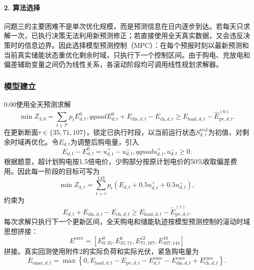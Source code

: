 \documentclass{cumcmthesis}
\newcommand{\Tset}{\mathcal{T}}
\begin{document}
\paragraph{2. 算法选择}

问题三的主要困难不是单次优化规模，而是预测信息在日内逐步到达。若每天只求解一次，已执行决策无法利用新预测修正；若直接使用全天真实数据，又会违反决策时的信息边界。因此选择模型预测控制（MPC）：在每个预报时刻以最新预测和当前真实储能状态重优化剩余时域，只执行下一个控制区间。由于购电、充放电和偏差辅助变量之间仍为线性关系，各滚动阶段均可调用线性规划求解器。

\subsubsection{模型建立}

0:00使用全天预测求解
\begin{equation}
\min Z_{3,0}=\sum_{t\in\Tset}p_tE^0_{d,t},qquad
E^0_{d,t}+E_{\mathrm{dis},d,t}-E_{\mathrm{ch},d,t}
\geq E_{\mathrm{load},d,t}-\widehat E^{(0)}_{\mathrm{pv},d,t}.
\tag{17}
\end{equation}
在更新断面$\tau\in\{35,71,107\}$，锁定已执行时段，以当前运行状态$S_{d,\tau}^{\mathrm{real}}$为初值，对剩余时域再优化。令$E_{d,t}$为调整后购电量，引入
\begin{equation}
E_{d,t}-E^0_{d,t}=u^+_{d,t}-u^-_{d,t},qquad u^+_{d,t},u^-_{d,t}\geq0.
\tag{18}
\end{equation}
根据题意，超计划购电按1.5倍电价，少购部分按原计划电价的50\%收取偏差费用。因此每一阶段的目标可写为
\begin{equation}
\min Z_{3,\tau}=\sum_{t=\tau}^{143}p_t
\left(E_{d,t}+0.5u^+_{d,t}+0.5u^-_{d,t}\right),
\tag{19}
\end{equation}
约束为
\begin{equation}
E_{d,t}+E_{\mathrm{dis},d,t}-E_{\mathrm{ch},d,t}
\geq E_{\mathrm{load},d,t}-\widetilde E_{\mathrm{pv},d,t}^{(\tau)}.
\tag{20}
\end{equation}
每次求解只执行下一个更新区间，全天购电和储能轨迹按模型预测控制的滚动时域思想拼接\cite{maciejowski2002,parisio2014}：
\begin{equation}
E^{\mathrm{exec}}=\left[E^0_{0:35},E^6_{35:71},E^{12}_{71:107},E^{18}_{107:144}\right]
\tag{21}
\end{equation}
拼接。真实回测使用附件2的实际负荷和实际光伏，紧急购电量为
\begin{equation}
E_{\mathrm{emer},d,t}=\max\left\{0,E_{\mathrm{load},d,t}-E_{\mathrm{pv},d,t}
-E^{\mathrm{exec}}_{d,t}-E^{\mathrm{exec}}_{\mathrm{dis},d,t}
+E^{\mathrm{exec}}_{\mathrm{ch},d,t}\right\}.
\tag{22}
\end{equation}
\end{document}
